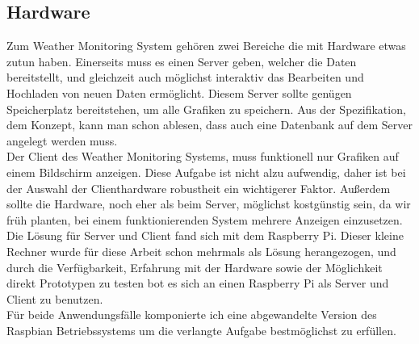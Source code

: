 \subsection{Hardware}
Zum Weather Monitoring System gehören zwei Bereiche die mit Hardware etwas zutun haben.
Einerseits muss es einen Server geben, welcher die Daten bereitstellt,
und gleichzeit auch möglichst interaktiv das Bearbeiten und Hochladen von neuen Daten ermöglicht.
Diesem Server sollte genügen Speicherplatz bereitstehen,
um alle Grafiken zu speichern.
Aus der Spezifikation, dem Konzept, kann man schon ablesen, dass auch eine Datenbank auf dem
Server angelegt werden muss.\\
Der Client des Weather Monitoring Systems, muss funktionell nur Grafiken auf einem Bildschirm anzeigen.
Diese Aufgabe ist nicht alzu aufwendig, daher ist bei der Auswahl der Clienthardware robustheit ein wichtigerer Faktor. Außerdem sollte die Hardware, noch eher als beim Server, möglichst kostgünstig sein,
da wir früh planten, bei einem funktionierenden System mehrere Anzeigen einzusetzen.
Die Lösung für Server und Client fand sich mit dem Raspberry Pi.
Dieser kleine Rechner wurde für diese Arbeit schon mehrmals als Lösung herangezogen,
und durch die Verfügbarkeit, Erfahrung mit der Hardware sowie der Möglichkeit direkt Prototypen zu testen bot es sich an einen Raspberry Pi als Server und Client zu benutzen.\\
Für beide Anwendungsfälle komponierte ich eine abgewandelte Version des Raspbian Betriebssystems um die verlangte Aufgabe bestmöglichst zu erfüllen.


